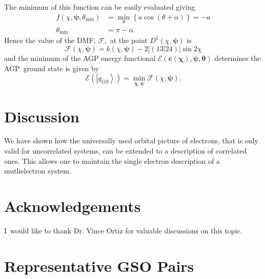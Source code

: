 \documentclass[aps,preprint]{revtex4}%
\begin{document}
The minimum of this function can be easily evaluated giving
\begin{align}
f\left(  \chi,\bm{\psi,}\theta_{\min}\right)   &  =\min_{\theta}\left\{
a\cos\left(  \theta+\alpha\right)  \right\}  =-a\\
\theta_{\min}  &  =\pi-\alpha.
\end{align}
Hence the value of the DMF, $\mathcal{F},$ at the point $D^{1}\left(
\chi,\bm{\psi}\right)  $ is%
\begin{equation}
\mathcal{F}\left(  \chi,\bm{\psi}\right)  =k\left(  \chi,\bm{\psi }\right)
-2\left\vert \left(  \left.  13\right\vert 24\right)  \right\vert \sin2\chi
\end{equation}
and the minimum of the AGP energy functional $\mathcal{E}\left(  \bm{c}\left(
\bm{\chi}\right)  ,\bm{\psi,\theta}\right)  $ determines the AGP\ ground state
is given by
\begin{equation}
\mathcal{E}\left(  \left\vert g_{GS}\right\rangle \right)  =\min
_{\bm{\chi,\psi}}\mathcal{F}\left(  \chi,\bm{\psi}\right)  .
\end{equation}


\section{Discussion}

We have shown how the universally used orbital picture of electrons, that is
only valid for uncorrelated systems, can be extended to a description of
correlated ones. This allows one to maintain the single electron description
of a mutlielectron system.

\section{Acknowledgements}

I\ would like to thank Dr. Vince Ortiz for valuable discussions on this topic.

\appendix


\section{Representative GSO Pairs\label{GSOpairs}}
\end{document}
